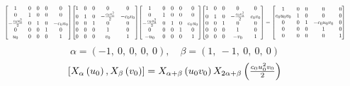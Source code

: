 \documentclass[11pt]{article}
\theoremstyle{definition}
\begin{document}
\[
\scaletoalign{\textwidth}{{\left[\begin{matrix}1 & 0 & 0 & 0 & 0\\0 & 1 & 0 & 0 & 0\\- \frac{c_{0} u_{0}^{2}}{2} & 0 & 1 & 0 & - c_{0} u_{0}\\0 & 0 & 0 & 1 & 0\\u_{0} & 0 & 0 & 0 & 1\end{matrix}\right]} {\left[\begin{matrix}1 & 0 & 0 & 0 & 0\\0 & 1 & 0 & - \frac{c_{0} v_{0}^{2}}{2} & - c_{0} v_{0}\\0 & 0 & 1 & 0 & 0\\0 & 0 & 0 & 1 & 0\\0 & 0 & 0 & v_{0} & 1\end{matrix}\right]} {\left[\begin{matrix}1 & 0 & 0 & 0 & 0\\0 & 1 & 0 & 0 & 0\\- \frac{c_{0} u_{0}^{2}}{2} & 0 & 1 & 0 & c_{0} u_{0}\\0 & 0 & 0 & 1 & 0\\- u_{0} & 0 & 0 & 0 & 1\end{matrix}\right]} {\left[\begin{matrix}1 & 0 & 0 & 0 & 0\\0 & 1 & 0 & - \frac{c_{0} v_{0}^{2}}{2} & c_{0} v_{0}\\0 & 0 & 1 & 0 & 0\\0 & 0 & 0 & 1 & 0\\0 & 0 & 0 & - v_{0} & 1\end{matrix}\right]} = {\left[\begin{matrix}1 & 0 & 0 & 0 & 0\\c_{0} u_{0} v_{0} & 1 & 0 & 0 & 0\\0 & 0 & 1 & - c_{0} u_{0} v_{0} & 0\\0 & 0 & 0 & 1 & 0\\0 & 0 & 0 & 0 & 1\end{matrix}\right]}}
\]
\[
\alpha = \left( -1, \  0, \  0, \  0, \  0\right), \quad \beta = \left( 1, \  -1, \  0, \  0, \  0\right)
\]
\[
\scaletoalign{\textwidth}{\left[ X_{\alpha}\left(u_{0}\right), X_{\beta}\left(v_{0}\right) \right] = X_{\alpha + \beta}\left(u_{0} v_{0}\right) X_{2\alpha + \beta}\left(\frac{c_{0} u_{0}^{2} v_{0}}{2}\right)}
\]
\end{document}
